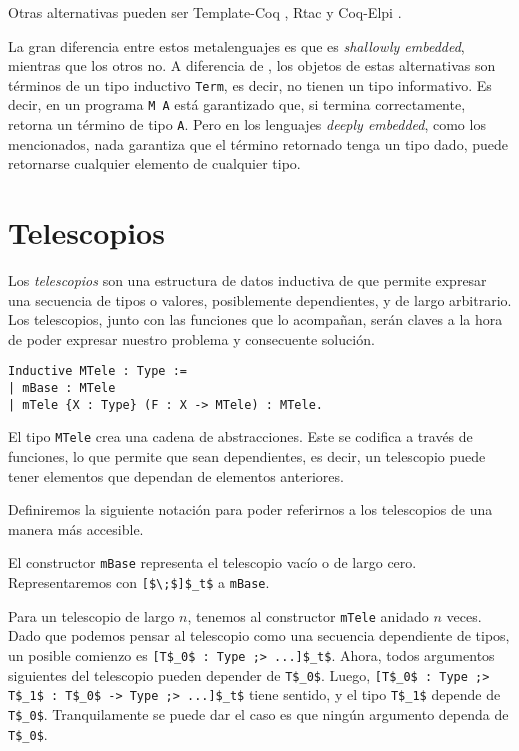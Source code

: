 Otras alternativas pueden ser Template-Coq \cite{DBLP:conf/itp/AnandBCST18}, Rtac \cite{DBLP:conf/esop/MalechaB16} y Coq-Elpi \cite{tassi:hal-01637063}.

La gran diferencia entre estos metalenguajes es que \Mtac es \emph{shallowly embedded}, mientras que los otros no. A diferencia de \Mtac, los objetos de estas alternativas son términos de un tipo inductivo \lstinline{Term}, es decir, no tienen un tipo informativo. Es decir, en \Mtac un programa \lstinline{M A} está garantizado que, si termina correctamente, retorna un término de tipo \lstinline{A}. Pero en los lenguajes \emph{deeply embedded}, como los mencionados, nada garantiza que el término retornado tenga un tipo dado, puede retornarse cualquier elemento de cualquier tipo.

\section{Telescopios}

Los \emph{telescopios} son una estructura de datos inductiva de \Mtac que permite expresar una secuencia de tipos o valores, posiblemente dependientes, y de largo arbitrario.
Los telescopios, junto con las funciones que lo acompañan, serán claves a la hora de poder expresar nuestro problema y consecuente solución.

\begin{lstlisting}[float=h,frame=tb,caption={Definicion de telescopio},label=lst:MTele]
Inductive MTele : Type :=
| mBase : MTele
| mTele {X : Type} (F : X -> MTele) : MTele.
\end{lstlisting}

El tipo \lstinline{MTele} crea una cadena de abstracciones.
Este se codifica a través de funciones, lo que permite que sean dependientes, es decir, un telescopio puede tener elementos que dependan de elementos anteriores.

Definiremos la siguiente notación para poder referirnos a los telescopios de una manera más accesible.

El constructor \lstinline{mBase} representa el telescopio vacío o de largo cero. Representaremos con \lstinline{[$\;$]$_t$} a \lstinline{mBase}.

Para un telescopio de largo $n$, tenemos al constructor \lstinline{mTele} anidado $n$ veces. Dado que podemos pensar al telescopio como una secuencia dependiente de tipos, un posible comienzo es \lstinline{[T$_0$ : Type ;> ...]$_t$}. Ahora, todos argumentos siguientes del telescopio pueden depender de \lstinline{T$_0$}. Luego, \lstinline{[T$_0$ : Type ;> T$_1$ : T$_0$ -> Type ;> ...]$_t$} tiene sentido, y el tipo \lstinline{T$_1$} depende de \lstinline{T$_0$}. Tranquilamente se puede dar el caso es que ningún argumento dependa de \lstinline{T$_0$}.


